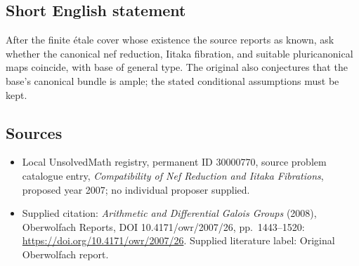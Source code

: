 \documentclass[11pt]{article}
\begin{document}
\subsection{Short English statement}
After the finite \'etale cover whose existence the source reports as known, ask whether the canonical nef reduction, Iitaka fibration, and suitable pluricanonical maps coincide, with base of general type. The original also conjectures that the base's canonical bundle is ample; the stated conditional assumptions must be kept.
\subsection{Sources}
\begin{itemize}\item Local UnsolvedMath registry, permanent ID 30000770, source problem catalogue entry, \emph{Compatibility of Nef Reduction and Iitaka Fibrations}, proposed year 2007; no individual proposer supplied.\item Supplied citation: \emph{Arithmetic and Differential Galois Groups} (2008), Oberwolfach Reports, DOI 10.4171/owr/2007/26, pp.\ 1443--1520: \url{https://doi.org/10.4171/owr/2007/26}. Supplied literature label: Original Oberwolfach report.\end{itemize}
\end{document}
